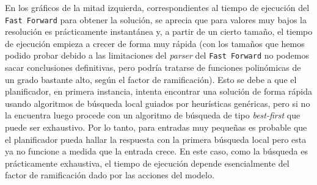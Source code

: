 
En los gráficos de la mitad izquierda, correspondientes al tiempo de ejecución 
del \texttt{Fast Forward} para obtener la solución, se aprecia que para 
valores muy bajos la resolución es prácticamente instantánea y, a partir de 
un cierto tamaño, el tiempo de ejecución empieza a crecer de forma muy rápida 
(con los tamaños que hemos podido probar debido a las limitaciones del 
\textit{parser} del \texttt{Fast Forward} no podemos sacar conclusiones 
definitivas, pero podría tratarse de funciones polinómicas de un grado 
bastante alto, según el factor de ramificación). Esto se debe a que el 
planificador, en primera instancia, intenta encontrar una solución de forma 
rápida usando algoritmos de búsqueda local guiados por heurísticas genéricas, 
pero si no la encuentra luego procede con un algoritmo de búsqueda de tipo
\textit{best-first} que puede ser exhaustivo. Por lo tanto, para entradas 
muy pequeñas es probable que el planificador pueda hallar la respuesta con 
la primera búsqueda local pero esta ya no funcione a medida que la entrada 
crece. En este caso, como la búsqueda es prácticamente exhaustiva, el tiempo 
de ejecución depende esencialmente del factor de ramificación dado por las 
acciones del modelo.


